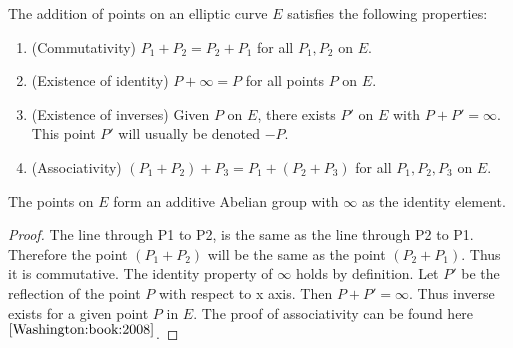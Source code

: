 \begin{theorem}
The addition of points on an elliptic curve $E$ satisfies the following properties:
\begin{enumerate}
    \item (Commutativity) $P_1 + P_2 = P_2 + P_1$ for all $P_1, P_2$ on $E$.
    \item (Existence of identity) $P + \infty = P$ for all points $P$ on $E$.
    \item (Existence of inverses) Given $P$ on $E$, there exists $P'$ on $E$ with $P + P' = \infty$. This point $P'$ will usually be denoted $-P$.
    \item (Associativity) $(P_1 + P_2) + P_3 = P_1 + (P_2 + P_3)$ for all $P_1, P_2, P_3$ on $E$.
\end{enumerate}
The points on $E$ form an additive Abelian group with $\infty$ as the identity element.
\end{theorem}
\begin{proof}
The line through P1 to P2, is the same as the line through P2 to P1. Therefore the point $(P_1 + P_2)$ will be the same as the point $(P_2+P_1)$. Thus it is commutative. The identity property of $\infty$ holds by definition. Let $P'$ be the reflection of the point $P$ with respect to x axis. Then $P + P' = \infty$. Thus inverse exists for a given point $P$ in $E$. The proof of associativity can be found here $^{\cite{Washington:book:2008}}$.
\end{proof}

\begin{center}
\end{center}


